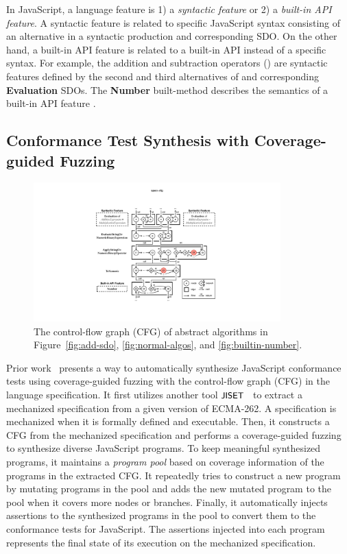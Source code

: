 In JavaScript, a language feature is 1) a \textit{syntactic feature} or 2) a
\textit{built-in API feature}.
%
A syntactic feature is related to specific JavaScript syntax consisting of an
alternative in a syntactic production and corresponding SDO.
%
On the other hand, a built-in API feature is related to a built-in API instead
of a specific syntax.
%
For example, the addition and subtraction operators (\scode{+}) are syntactic
features defined by the second and third alternatives of
 and corresponding \textbf{Evaluation} SDOs.
%
The \textbf{Number} built-method describes the semantics of a built-in API
feature .




\subsection{Conformance Test Synthesis with Coverage-guided Fuzzing}

\begin{figure}
  \centering
  \includegraphics[width=0.85\textwidth]{img/spec-cfg}
  \caption{
    The control-flow graph (CFG) of abstract algorithms in
    Figure~\ref{fig:add-sdo}, \ref{fig:normal-algos}, and
    \ref{fig:builtin-number}.
  }
  \label{fig:spec-cfg}
\end{figure}

Prior work~\cite{jest} presents a way to automatically synthesize JavaScript
conformance tests using coverage-guided fuzzing with the control-flow graph
(CFG) in the language specification.
%
It first utilizes another tool $\textsf{\small JISET}$~\cite{jiset} to extract a mechanized
specification from a given version of ECMA-262.
%
A specification is mechanized when it is formally defined and executable.
%
Then, it constructs a CFG from the mechanized specification and performs
a coverage-guided fuzzing~\cite{afl} to synthesize diverse JavaScript programs.
%
To keep meaningful synthesized programs, it maintains a \textit{program pool}
based on coverage information of the programs in the extracted CFG.
%
It repeatedly tries to construct a new program by mutating programs in the pool
and adds the new mutated program to the pool when it covers more nodes or
branches.
%
Finally, it automatically injects assertions to the synthesized programs in the
pool to convert them to the conformance tests for JavaScript.
%
The assertions injected into each program represents the final state of its
execution on the mechanized specification.

